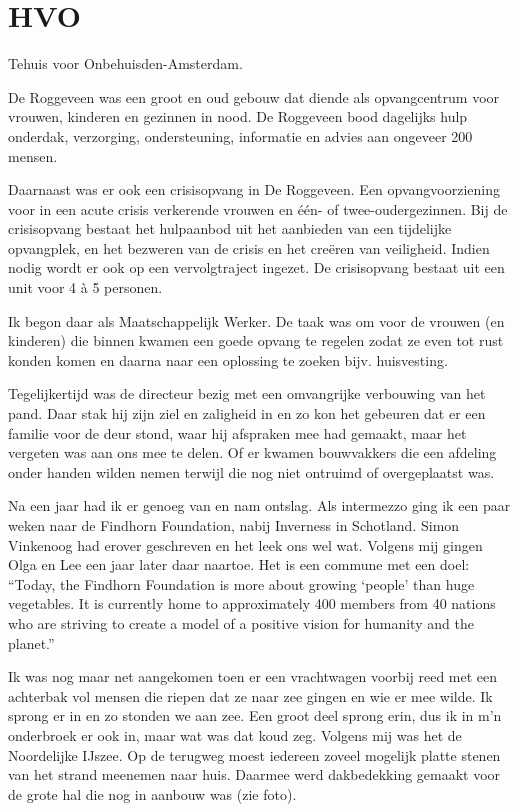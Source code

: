 \documentclass[10pt,twoside,openright]{memoir}
\begin{document}
\chapter{HVO} %
\label{cha:hvo}

Tehuis voor Onbehuisden-Amsterdam.

De Roggeveen was een groot en oud gebouw dat diende als opvangcentrum voor vrouwen, kinderen en gezinnen in nood. De Roggeveen bood dagelijks hulp onderdak, verzorging, ondersteuning, informatie en advies aan ongeveer 200 mensen.

Daarnaast was er ook een crisisopvang in De Roggeveen. Een opvangvoorziening voor in een acute crisis verkerende vrouwen en één- of twee-oudergezinnen. Bij de crisisopvang bestaat het hulpaanbod uit het aanbieden van een tijdelijke opvangplek, en het bezweren van de crisis en het creëren van veiligheid. Indien nodig wordt er ook op een vervolgtraject ingezet. De crisisopvang bestaat uit een unit voor 4 à 5 personen.

Ik begon daar als Maatschappelijk Werker. De taak was om voor de vrouwen (en kinderen) die binnen kwamen een goede opvang te regelen zodat ze even tot rust konden komen en daarna naar een oplossing te zoeken bijv. huisvesting. 

Tegelijkertijd was de directeur bezig met een omvangrijke verbouwing van het pand. Daar stak hij zijn ziel en zaligheid in en zo kon het gebeuren dat er een familie voor de deur stond, waar hij afspraken mee had gemaakt, maar het vergeten was aan ons mee te delen. Of er kwamen bouwvakkers die een afdeling onder handen wilden nemen terwijl die nog niet ontruimd of overgeplaatst was. 

Na een jaar had ik er genoeg van en nam ontslag. Als intermezzo ging ik een paar weken naar de Findhorn Foundation, nabij Inverness in Schotland. Simon Vinkenoog had erover geschreven en het leek ons wel wat. Volgens mij gingen Olga en Lee een jaar later daar naartoe. Het is een commune met een doel: ``Today, the Findhorn Foundation is more about growing `people' than huge vegetables. It is currently home to approximately 400 members from 40 nations who are striving to create a model of a positive vision for humanity and the planet.''

Ik was nog maar net aangekomen toen er een vrachtwagen voorbij reed met een achterbak vol mensen die riepen dat ze naar zee gingen en wie er mee wilde. Ik sprong er in en zo stonden we aan zee. Een groot deel sprong erin, dus ik in m’n onderbroek er ook in, maar wat was dat koud zeg. Volgens mij was het de Noordelijke IJszee. Op de terugweg moest iedereen zoveel mogelijk platte stenen van het strand meenemen naar huis. Daarmee werd dakbedekking gemaakt voor de grote hal die nog in aanbouw was (zie foto). 
\end{document}
